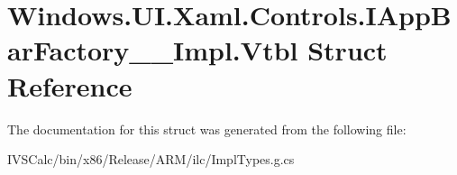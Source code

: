 \hypertarget{struct_windows_1_1_u_i_1_1_xaml_1_1_controls_1_1_i_app_bar_factory_____impl_1_1_vtbl}{}\section{Windows.\+U\+I.\+Xaml.\+Controls.\+I\+App\+Bar\+Factory\+\_\+\+\_\+\+Impl.\+Vtbl Struct Reference}
\label{struct_windows_1_1_u_i_1_1_xaml_1_1_controls_1_1_i_app_bar_factory_____impl_1_1_vtbl}


The documentation for this struct was generated from the following file\+:\begin{DoxyCompactItemize}
\item 
I\+V\+S\+Calc/bin/x86/\+Release/\+A\+R\+M/ilc/Impl\+Types.\+g.\+cs\end{DoxyCompactItemize}
